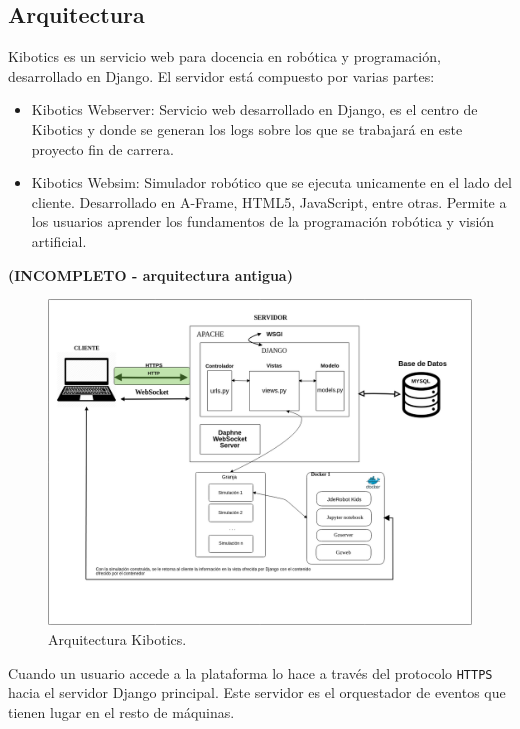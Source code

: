 \documentclass[11pt,a4paper]{book}
\begin{document}
			\subsection{Arquitectura}
				Kibotics es un servicio web para docencia en robótica y programación, desarrollado en Django. El servidor está compuesto por varias partes:
				
				\begin{itemize}
					\item Kibotics Webserver: Servicio web desarrollado en Django, es el centro de Kibotics y donde se generan los logs sobre los que se trabajará en este proyecto fin de carrera.
							
					
					\item Kibotics Websim: Simulador robótico que se ejecuta unicamente en el lado del cliente. Desarrollado en A-Frame, HTML5, JavaScript, entre otras. Permite a los usuarios aprender los fundamentos de la programación robótica y visión artificial.
				\end{itemize}
				
				\textbf{(INCOMPLETO - arquitectura antigua)}
				\begin{figure}[H]
					\centering
					\includegraphics[width=13cm, keepaspectratio]{img/esquema_Kibotics.png}
					\caption{Arquitectura Kibotics.}
					\label{fig:arquitectura_kibotics}
				\end{figure}
			
				Cuando un usuario accede a la plataforma lo hace a través del protocolo \texttt{HTTPS} hacia el servidor Django principal. Este servidor es el orquestador de eventos que tienen lugar en el resto de máquinas.
				
\end{document}
